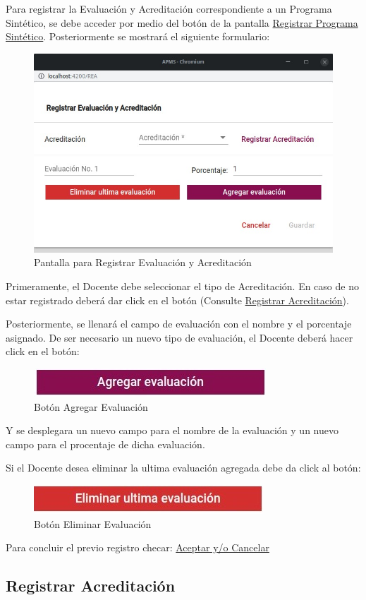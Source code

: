 Para registrar la Evaluación y Acreditación correspondiente a un Programa Sintético, se debe acceder por medio del botón  de la pantalla \hyperlink{RegistrarPS}{Registrar Programa Sintético}. Posteriormente se mostrará el siguiente formulario:


\begin{figure}[!h]
    \centering
    \hypertarget{RegEyA}{\includegraphics[width=0.5\linewidth]{images/SP6/8.jpeg}}
    \caption{Pantalla para Registrar Evaluación y Acreditación}
\end{figure}

Primeramente, el Docente debe seleccionar el tipo de Acreditación. En caso de no estar registrado deberá dar click en el botón (Consulte \hyperlink{RegA}{Registrar Acreditación}).

Posteriormente, se llenará el campo de evaluación con el nombre y el porcentaje asignado. De ser necesario un nuevo tipo de evaluación, el Docente deberá hacer click en el botón:

\begin{figure}[!h]
    \centering
    \includegraphics[width=0.3\linewidth]{images/SP6/BotonEval.jpeg}
    \caption{Botón Agregar Evaluación}
\end{figure}

Y se desplegara un nuevo campo para el nombre de la evaluación y un nuevo campo para el procentaje de dicha evaluación.

Si el Docente desea eliminar la ultima evaluación agregada debe da click al botón:


\begin{figure}[!h]
    \centering
    \includegraphics[width=0.3\linewidth]{images/SP6/BotonEliEval.jpeg}
    \caption{Botón Eliminar Evaluación}
\end{figure}
Para concluir el previo registro checar:
\hyperlink{AceptarCancelar}{Aceptar y/o Cancelar}
\pagebreak
\hypertarget{RegA}{\subsection{Registrar Acreditación}}

